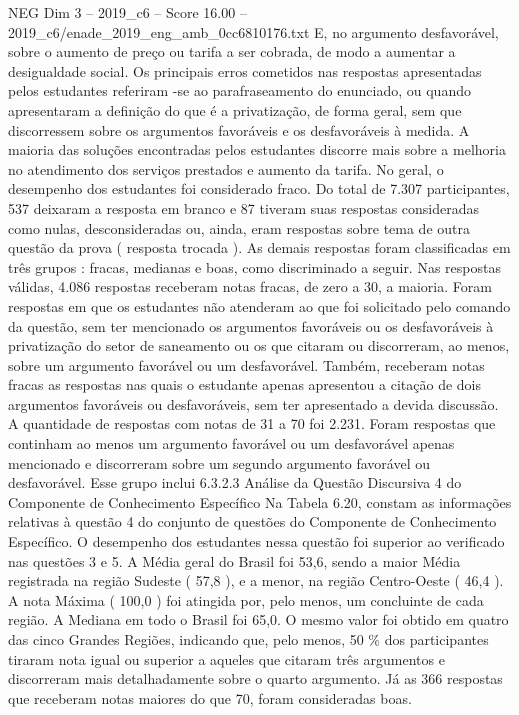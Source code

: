 \begin{textsample}{NEG Dim 3 – 2019\_c6 – Score 16.00 – 2019\_c6/enade\_2019\_eng\_amb\_0cc6810176.txt}
E, no argumento desfavorável, sobre o aumento de preço ou tarifa a ser cobrada, de modo a aumentar a desigualdade social.
Os principais erros cometidos nas respostas apresentadas pelos estudantes referiram -se ao parafraseamento do enunciado, ou quando apresentaram a definição do que é a privatização, de forma geral, sem que discorressem sobre os argumentos favoráveis e os desfavoráveis à medida.
A maioria das soluções encontradas pelos estudantes discorre mais sobre a melhoria no atendimento dos serviços prestados e aumento da tarifa.
No geral, o desempenho dos estudantes foi considerado fraco.
Do total de 7.307 participantes, 537 deixaram a resposta em branco e 87 tiveram suas respostas consideradas como nulas, desconsideradas ou, ainda, eram respostas sobre tema de outra questão da prova ( resposta trocada ).
As demais respostas foram classificadas em três grupos : fracas, medianas e boas, como discriminado a seguir.
Nas respostas válidas, 4.086 respostas receberam notas fracas, de zero a 30, a maioria.
Foram respostas em que os estudantes não atenderam ao que foi solicitado pelo comando da questão, sem ter mencionado os argumentos favoráveis ou os desfavoráveis à privatização do setor de saneamento ou os que citaram ou discorreram, ao menos, sobre um argumento favorável ou um desfavorável.
Também, receberam notas fracas as respostas nas quais o estudante apenas apresentou a citação de dois argumentos favoráveis ou desfavoráveis, sem ter apresentado a devida discussão.
A quantidade de respostas com notas de 31 a 70 foi 2.231.
Foram respostas que continham ao menos um argumento favorável ou um desfavorável apenas mencionado e discorreram sobre um segundo argumento favorável ou desfavorável.
Esse grupo inclui 6.3.2.3 Análise da Questão Discursiva 4 do Componente de Conhecimento Específico Na Tabela 6.20, constam as informações relativas à questão 4 do conjunto de questões do Componente de Conhecimento Específico.
O desempenho dos estudantes nessa questão foi superior ao verificado nas questões 3 e 5.
A Média geral do Brasil foi 53,6, sendo a maior Média registrada na região Sudeste ( 57,8 ), e a menor, na região Centro-Oeste ( 46,4 ).
A nota Máxima ( 100,0 ) foi atingida por, pelo menos, um concluinte de cada região.
A Mediana em todo o Brasil foi 65,0.
O mesmo valor foi obtido em quatro das cinco Grandes Regiões, indicando que, pelo menos, 50 \% dos participantes tiraram nota igual ou superior a aqueles que citaram três argumentos e discorreram mais detalhadamente sobre o quarto argumento.
Já as 366 respostas que receberam notas maiores do que 70, foram consideradas boas.

\end{textsample}
